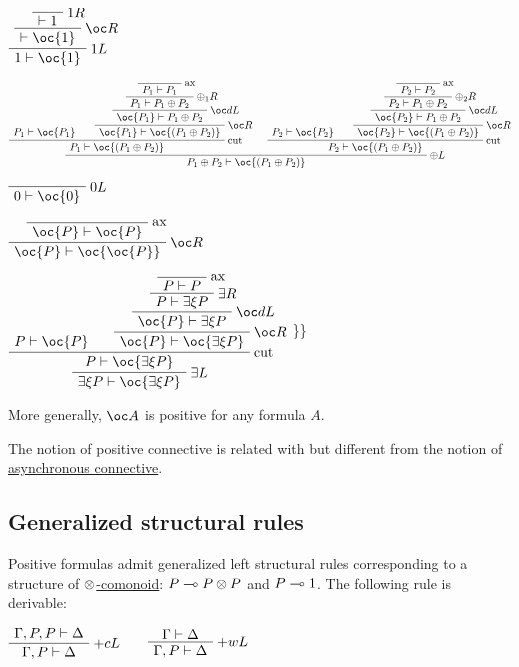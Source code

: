 \(\LabelRule{\one R}
\NulRule{\vdash\one}
\LabelRule{\oc R}
\UnaRule{\vdash\oc{\one}}
\LabelRule{\one L}
\UnaRule{\one\vdash\oc{\one}}
\DisplayProof\)

\(\AxRule{P_1\vdash\oc{P_1}}
\LabelRule{\rulename{ax}}
\NulRule{P_1\vdash P_1}
\LabelRule{\plus_1 R}
\UnaRule{P_1\vdash P_1\plus P_2}
\LabelRule{\oc d L}
\UnaRule{\oc{P_1}\vdash P_1\plus P_2}
\LabelRule{\oc R}
\UnaRule{\oc{P_1}\vdash\oc{(P_1\plus P_2)}}
\LabelRule{\rulename{cut}}
\BinRule{P_1\vdash\oc{(P_1\plus P_2)}}
\AxRule{P_2\vdash\oc{P_2}}
\LabelRule{\rulename{ax}}
\NulRule{P_2\vdash P_2}
\LabelRule{\plus_2 R}
\UnaRule{P_2\vdash P_1\plus P_2}
\LabelRule{\oc d L}
\UnaRule{\oc{P_2}\vdash P_1\plus P_2}
\LabelRule{\oc R}
\UnaRule{\oc{P_2}\vdash\oc{(P_1\plus P_2)}}
\LabelRule{\rulename{cut}}
\BinRule{P_2\vdash\oc{(P_1\plus P_2)}}
\LabelRule{\plus L}
\BinRule{P_1\plus P_2\vdash\oc{(P_1\plus P_2)}}
\DisplayProof\)

\(\LabelRule{\zero L}
\NulRule{\zero\vdash\oc{\zero}}
\DisplayProof\)

\(\LabelRule{\rulename{ax}}
\NulRule{\oc{P}\vdash\oc{P}}
\LabelRule{\oc R}
\UnaRule{\oc{P}\vdash\oc{\oc{P}}}
\DisplayProof\)

\(\AxRule{P\vdash\oc{P}}
\LabelRule{\rulename{ax}}
\NulRule{P\vdash P}
\LabelRule{\exists R}
\UnaRule{P\vdash \exists\xi P}
\LabelRule{\oc d L}
\UnaRule{\oc{P}\vdash \exists\xi P}
\LabelRule{\oc R}
\UnaRule{\oc{P}\vdash\oc{\exists\xi P}}
\LabelRule{\rulename{cut}}
\BinRule{P\vdash\oc{\exists\xi P}}
\LabelRule{\exists L}
\UnaRule{\exists\xi P\vdash\oc{\exists\xi P}}
\DisplayProof\) \}\}

More generally, \(\oc A\) is positive for any formula \(A\).

The notion of positive connective is related with but different from the
notion of \href{asynchronous_connective}{asynchronous connective}.

\subsection{Generalized structural
rules}\label{generalized-structural-rules-1}

Positive formulas admit generalized left structural rules corresponding
to a structure of \href{Wikipedia:Comonoid}{\(\otimes\)-comonoid}:
\(P\multimap P\otimes P\) and \(P\multimap1\). The following rule is derivable:

\(\AxRule{\Gamma,P,P\vdash\Delta}
\LabelRule{+ c L}
\UnaRule{\Gamma,P\vdash\Delta}
\DisplayProof
\qquad
\AxRule{\Gamma\vdash\Delta}
\LabelRule{+ w L}
\UnaRule{\Gamma,P\vdash\Delta}
\DisplayProof\)

